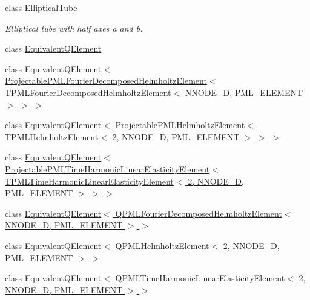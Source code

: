 \begin{DoxyCompactItemize}
class \hyperlink{classoomph_1_1EllipticalTube}{Elliptical\+Tube}
\begin{DoxyCompactList}\small\item\em Elliptical tube with half axes a and b. \end{DoxyCompactList}\item 
class \hyperlink{classoomph_1_1EquivalentQElement}{Equivalent\+Q\+Element}
\item 
class \hyperlink{classoomph_1_1EquivalentQElement_3_01ProjectablePMLFourierDecomposedHelmholtzElement_3_01TPMLFou44c336b8fdba93259ce5a48473442820}{Equivalent\+Q\+Element$<$ Projectable\+P\+M\+L\+Fourier\+Decomposed\+Helmholtz\+Element$<$ T\+P\+M\+L\+Fourier\+Decomposed\+Helmholtz\+Element$<$ N\+N\+O\+D\+E\+\_\+D, P\+M\+L\+\_\+\+E\+L\+E\+M\+E\+N\+T $>$ $>$ $>$}
\item 
class \hyperlink{classoomph_1_1EquivalentQElement_3_01ProjectablePMLHelmholtzElement_3_01TPMLHelmholtzElement_3_0495133458c30170646ec413b7351c35f}{Equivalent\+Q\+Element$<$ Projectable\+P\+M\+L\+Helmholtz\+Element$<$ T\+P\+M\+L\+Helmholtz\+Element$<$ 2, N\+N\+O\+D\+E\+\_\+D, P\+M\+L\+\_\+\+E\+L\+E\+M\+E\+N\+T $>$ $>$ $>$}
\item 
class \hyperlink{classoomph_1_1EquivalentQElement_3_01ProjectablePMLTimeHarmonicLinearElasticityElement_3_01TPMLT28f1822ee15ad2f831731f6bfa5d7232}{Equivalent\+Q\+Element$<$ Projectable\+P\+M\+L\+Time\+Harmonic\+Linear\+Elasticity\+Element$<$ T\+P\+M\+L\+Time\+Harmonic\+Linear\+Elasticity\+Element$<$ 2, N\+N\+O\+D\+E\+\_\+D, P\+M\+L\+\_\+\+E\+L\+E\+M\+E\+N\+T $>$ $>$ $>$}
\item 
class \hyperlink{classoomph_1_1EquivalentQElement_3_01QPMLFourierDecomposedHelmholtzElement_3_01NNODE__1D_00_01PML__ELEMENT_01_4_01_4}{Equivalent\+Q\+Element$<$ Q\+P\+M\+L\+Fourier\+Decomposed\+Helmholtz\+Element$<$ N\+N\+O\+D\+E\+\_\+D, P\+M\+L\+\_\+\+E\+L\+E\+M\+E\+N\+T $>$ $>$}
\item 
class \hyperlink{classoomph_1_1EquivalentQElement_3_01QPMLHelmholtzElement_3_012_00_01NNODE__1D_00_01PML__ELEMENT_01_4_01_4}{Equivalent\+Q\+Element$<$ Q\+P\+M\+L\+Helmholtz\+Element$<$ 2, N\+N\+O\+D\+E\+\_\+D, P\+M\+L\+\_\+\+E\+L\+E\+M\+E\+N\+T $>$ $>$}
\item 
class \hyperlink{classoomph_1_1EquivalentQElement_3_01QPMLTimeHarmonicLinearElasticityElement_3_012_00_01NNODE__1D_00_01PML__ELEMENT_01_4_01_4}{Equivalent\+Q\+Element$<$ Q\+P\+M\+L\+Time\+Harmonic\+Linear\+Elasticity\+Element$<$ 2, N\+N\+O\+D\+E\+\_\+D, P\+M\+L\+\_\+\+E\+L\+E\+M\+E\+N\+T $>$ $>$}

\end{DoxyCompactItemize}
